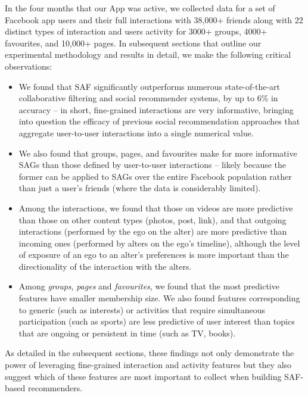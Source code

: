In the four months that our App was active, we collected data for a set of 
Facebook app users and their full interactions with 38,000+ friends along with 22
distinct types of interaction and users activity for 3000+ groups, 4000+ favourites, and 10,000+ pages. 
In subsequent sections that outline our experimental methodology and results in detail, 
we make the following critical observations:
\begin{itemize}
\item We found that SAF significantly 
outperforms numerous state-of-the-art collaborative filtering and social recommender 
systems, by up to 6\% in accuracy -- in short, fine-grained 
interactions are very informative, bringing into question the efficacy of 
previous social recommendation approaches that aggregate user-to-user interactions into 
a single numerical value.
\item We also found that groups, pages, and favourites make for more informative
SAGs than those defined by user-to-user interactions -- likely because the former can be
applied to SAGs over the entire Facebook population 
rather than just a user's friends (where the data is considerably limited).
\item Among the interactions, we found that those on videos are more predictive than those on other content types (photos, post, link), and that outgoing interactions (performed by the ego on the alter) 
are more predictive than incoming ones (performed by alters on the ego's timeline),
although the level of exposure of an ego to an alter's preferences is more 
important than the directionality of the interaction with the alters.
\item %
Among {\em groups}, {\em pages} and {\em favourites}, we found that the most  
predictive features have smaller membership size. We also found features
 corresponding to generic (such as interests) or activities that require 
 simultaneous participation (such as sports) are less predictive of 
 user interest than topics that are ongoing or persistent in time (such as TV, books).
\end{itemize}
As detailed in the subsequent sections, these findings 
not only demonstrate the power of leveraging fine-grained
interaction and activity features but they also suggest which of these
features are most important to collect when building SAF-based recommenders.


